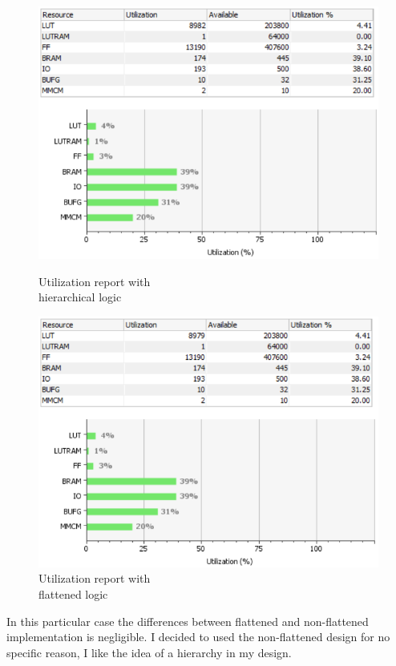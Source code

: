 \begin{figure}[H]
	\centering
	\begin{minipage}{.5\textwidth}
		\centering
		\includegraphics[width=.99\linewidth]{IMG/ch4/FirmwareNOFLAT/UTILIZATION}
		\caption{Utilization report with \\hierarchical logic}
		\label{fig:noflatutilization}
	\end{minipage}%
	\begin{minipage}{.5\textwidth}
		\centering
		\includegraphics[width=.99\linewidth]{IMG/ch4/FirmwareFLAT/UTILIZATION}
		\caption{Utilization report with \\flattened logic}
		\label{fig:flatutilization}
	\end{minipage}
\end{figure}
\noindent In this particular case the differences between flattened and non-flattened implementation is negligible. I decided to used the non-flattened design for no specific reason, I like the idea of a hierarchy in my design.



